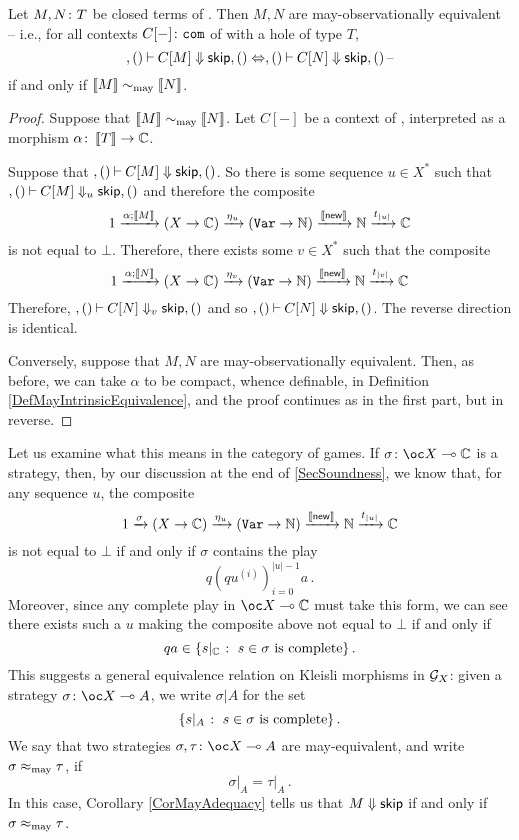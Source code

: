 \documentclass{article}
\begin{document}
\begin{theorem}
  Let $M,N\colon T$ be closed terms of \IAX. Then $M,N$ are may-observationally equivalent -- i.e., for all contexts $C[-]\colon {\mathtt{com}}$ of \IAX with a hole of type $T$, \[
    ,()\mathbin{\vdash} C[M] \Downarrow {\mathsf{skip}},() \Leftrightarrow ,()\mathbin{\vdash} C[N] \Downarrow {\mathsf{skip}},()\,\text{--}
    \]
  if and only if $\left\llbracket M\right\rrbracket \sim_{\operatorname{may}} \left\llbracket N\right\rrbracket$.
\end{theorem}
\begin{proof}
  Suppose that $\left\llbracket M\right\rrbracket\sim_{\operatorname{may}}\left\llbracket N\right\rrbracket$.  
  Let $C[-]$ be a context of \IAX, interpreted as a morphism $\alpha \colon \left\llbracket T\right\rrbracket \to \mathbb{C}$.

  Suppose that $,()\mathbin{\vdash} C[M] \Downarrow {\mathsf{skip}},()$.  
  So there is some sequence $u\in X^*$ such that $,()\mathbin{\vdash} C[M] \Downarrow_u {\mathsf{skip}},()$ and therefore the composite
  \[
    1 \xrightarrow{\alpha;\left\llbracket M\right\rrbracket}
    (X \to \mathbb{C}) \xrightarrow{\eta_u}
    ({\mathtt{Var}} \to \mathbb{N}) \xrightarrow{\left\llbracket\operatorname{{\mathsf{new}}}\right\rrbracket}
    \mathbb{N} \xrightarrow{t_{|u|}}
    \mathbb{C}
    \]
  is not equal to $\bot$.  
  Therefore, there exists some $v\in X^*$ such that the composite
  \[
    1 \xrightarrow{\alpha;\left\llbracket N\right\rrbracket}
    (X \to \mathbb{C}) \xrightarrow{\eta_v}
    ({\mathtt{Var}} \to \mathbb{N}) \xrightarrow{\left\llbracket\operatorname{{\mathsf{new}}}\right\rrbracket}
    \mathbb{N} \xrightarrow{t_{|v|}}
    \mathbb{C}
    \]
  Therefore, $,()\mathbin{\vdash} C[N] \Downarrow_v {\mathsf{skip}},()$ and so $,()\mathbin{\vdash} C[N] \Downarrow {\mathsf{skip}},()$.
  The reverse direction is identical.

  Conversely, suppose that $M,N$ are may-observationally equivalent.  
  Then, as before, we can take $\alpha$ to be compact, whence definable, in Definition \ref{DefMayIntrinsicEquivalence}, and the proof continues as in the first part, but in reverse.
\end{proof}

Let us examine what this means in the category of games.
If $\sigma\from \oc X \implies \bC$ is a strategy, then, by our discussion at the end of \sec\ref{SecSoundness}, we know that, for any sequence $u$, the composite
\[
  1 \xrightarrow{\sigma}
  (X \to \mathbb{C}) \xrightarrow{\eta_u}
  ({\mathtt{Var}} \to \mathbb{N}) \xrightarrow{\left\llbracket\operatorname{{\mathsf{new}}}\right\rrbracket}
  \mathbb{N} \xrightarrow{t_{|u|}}
  \mathbb{C}
  \]
is not equal to $\bot$ if and only if $\sigma$ contains the play
\[
  q (q u^{(i)})_{i=0}^{|u|-1} a\,.
  \]
Moreover, since any complete play in $\oc X \implies \bC$ must take this form, we can see there exists such a $u$ making the composite above not equal to $\bot$ if and only if
\[
  qa \in \{s\vert_{\mathbb{C}} \;\colon\; s\in\sigma\text{ is complete}\}\,.
  \]
This suggests a general equivalence relation on Kleisli morphisms in $\mathcal G_X$: given a strategy $\sigma\from \oc X \implies A$, we write $\sigma\vert A$ for the set
\[
  \{s\vert_A \;\colon\; s\in \sigma\text{ is complete}\}\,.
  \]
We say that two strategies $\sigma,\tau\from \oc X \implies A$ are may-equivalent, and write $\sigma\approx_{\operatorname{may}}\tau$, if
\[
  \sigma\vert_A = \tau\vert_A\,.
  \]
In this case, Corollary \ref{CorMayAdequacy} tells us that $M\Downarrow {\mathsf{skip}}$ if and only if $\sigma\approx_{\operatorname{may}}\tau$.
\end{document}
